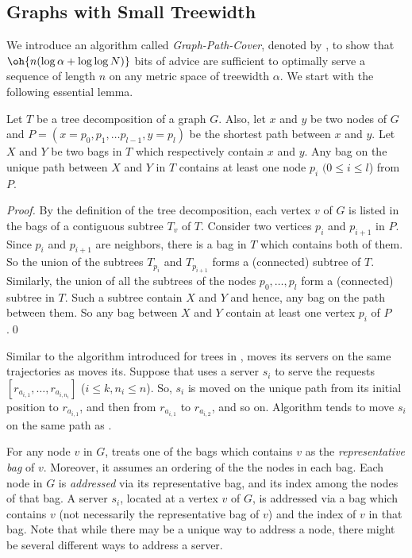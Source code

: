 \subsection{Graphs with Small Treewidth}
We introduce an algorithm called \textit{Graph-Path-Cover}, denoted by \npc, to show that $\oh{n (\log \alpha + \log \log N)}$ bits of advice are sufficient to optimally serve a sequence of length $n$ on any metric space of treewidth $\alpha$. We start with the following essential lemma. 

\begin{lemma} \label{lemmaMMT} Let $T$ be a tree decomposition of a graph $G$. Also, let $x$ and $y$ be two nodes of $G$ and $P = (x=p_0,p_1, \dots p_{l-1}, y=p_l)$ be the shortest path between $x$ and $y$. Let $X$ and $Y$ be two bags in $T$ which respectively contain $x$ and $y$. Any bag on the unique path between $X$ and $Y$ in $T$ contains at least one node $p_i$ $(0\leq i\leq l$) from $P$.
\end{lemma} 

\begin{proof}
By the definition of the tree decomposition, each vertex $v$ of $G$ is listed in the bags of a contiguous subtree $T_v$ of $T$. Consider two vertices $p_i$ and $p_{i+1}$ in $P$. Since $p_i$ and $p_{i+1}$ are neighbors, there is a bag in $T$ which contains both of them. So the union of the subtrees $T_{p_i}$ and $T_{p_{i+1}}$ forms a (connected) subtree of $T$. Similarly, the union of all the subtrees of the nodes $p_0, \ldots, p_l$ form a (connected) subtree in $T$. Such a subtree contain $X$ and $Y$ and hence, any bag on the path between them. So any bag between $X$ and $Y$ contain at least one vertex $p_i$ of $P$.\qed 
\end{proof}

Similar to the \pcv algorithm introduced for trees in \cite{WAOA11}, \npc moves its servers on the same trajectories as \opt moves its. Suppose that \OPT uses a server $s_i$ to serve the requests $\left[ r_{a_{i,1}} , \ldots, r_{a_{i,n_i}}\right]$ ($i\leq k, n_i \leq n$). So, $s_i$ is moved on the unique path from its initial position to $r_{a_{i,1}}$, and then from $r_{a_{i,1}}$ to $r_{a_{i,2}}$, and so on. Algorithm \pcv tends to move $s_i$ on the same path as \opt.

For any node $v$ in $G$, \npc treats one of the bags  which contains $v$ as the \textit{representative bag} of $v$. Moreover, it assumes an ordering of the the nodes in each bag. Each node in $G$ is \textit{addressed} via 
its representative bag, and its index among the nodes of that bag. A server $s_i$, located at a vertex $v$ of $G$, is addressed via a bag which contains $v$ (not necessarily the representative bag of $v$) and the index of $v$ in that bag. Note that while there may be a unique way to address a node, there might be several different ways to address a server.

